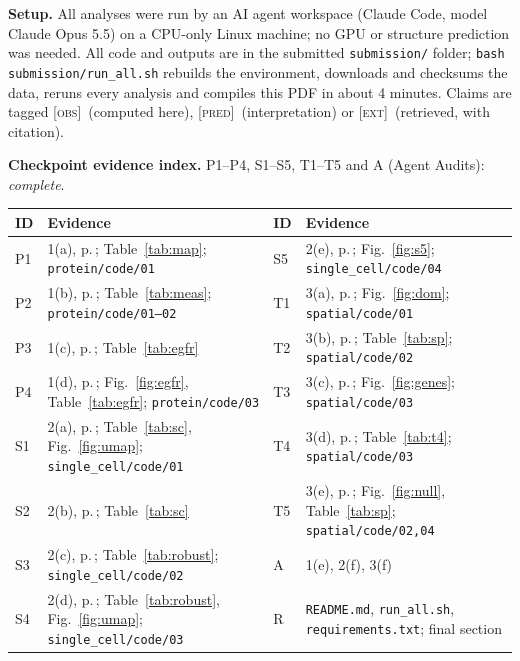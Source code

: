 \documentclass{cisXXX} %
\newcommand{\obs}{\textnormal{\textsc{[obs]}}}
\newcommand{\pred}{\textnormal{\textsc{[pred]}}}
\newcommand{\ext}{\textnormal{\textsc{[ext]}}}
\newcommand{\code}[1]{\texttt{\small #1}}
\begin{document}
\maketitle

\noindent\textbf{Setup.} All analyses were run by an AI agent workspace (Claude Code, model Claude Opus 5.5) on a CPU-only Linux machine; no GPU or structure prediction was needed. All code and outputs are in the submitted \code{submission/} folder; \code{bash submission/run\_all.sh} rebuilds the environment, downloads and checksums the data, reruns every analysis and compiles this PDF in about 4 minutes. Claims are tagged \obs\ (computed here), \pred\ (interpretation) or \ext\ (retrieved, with citation).

\medskip
\noindent\textbf{Checkpoint evidence index.} P1--P4, S1--S5, T1--T5 and A (Agent Audits): \emph{complete}.\\[3pt]
{\small
\begin{tabularx}{\linewidth}{@{}l Y l Y@{}}
\toprule
ID & Evidence & ID & Evidence \\
\midrule
P1 & 1(a), p.\,\pageref{p1}; Table~\ref{tab:map}; \code{protein/code/01} & S5 & 2(e), p.\,\pageref{s5}; Fig.~\ref{fig:s5}; \code{single\_cell/code/04} \\
P2 & 1(b), p.\,\pageref{p2}; Table~\ref{tab:meas}; \code{protein/code/01--02} & T1 & 3(a), p.\,\pageref{t1}; Fig.~\ref{fig:dom}; \code{spatial/code/01} \\
P3 & 1(c), p.\,\pageref{p3}; Table~\ref{tab:egfr} & T2 & 3(b), p.\,\pageref{t2}; Table~\ref{tab:sp}; \code{spatial/code/02} \\
P4 & 1(d), p.\,\pageref{p4}; Fig.~\ref{fig:egfr}, Table~\ref{tab:egfr}; \code{protein/code/03} & T3 & 3(c), p.\,\pageref{t3}; Fig.~\ref{fig:genes}; \code{spatial/code/03} \\
S1 & 2(a), p.\,\pageref{s1}; Table~\ref{tab:sc}, Fig.~\ref{fig:umap}; \code{single\_cell/code/01} & T4 & 3(d), p.\,\pageref{t4}; Table~\ref{tab:t4}; \code{spatial/code/03} \\
S2 & 2(b), p.\,\pageref{s2}; Table~\ref{tab:sc} & T5 & 3(e), p.\,\pageref{t5}; Fig.~\ref{fig:null}, Table~\ref{tab:sp}; \code{spatial/code/02,04} \\
S3 & 2(c), p.\,\pageref{s3}; Table~\ref{tab:robust}; \code{single\_cell/code/02} & A & 1(e), 2(f), 3(f) \\
S4 & 2(d), p.\,\pageref{s4}; Table~\ref{tab:robust}, Fig.~\ref{fig:umap}; \code{single\_cell/code/03} & R & \code{README.md}, \code{run\_all.sh}, \code{requirements.txt}; final section \\
\bottomrule
\end{tabularx}}
\end{document}
